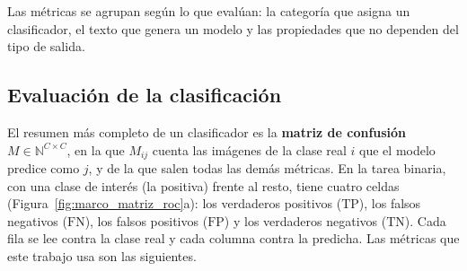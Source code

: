 Las métricas se agrupan según lo que evalúan: la categoría que asigna un clasificador, el texto que genera un
modelo y las propiedades que no dependen del tipo de salida.

\subsection{Evaluación de la clasificación}
\label{sec:marco_eval_clasif}

El resumen más completo de un clasificador es la \textbf{matriz de confusión} $M \in \mathbb{N}^{C \times C}$,
en la que $M_{ij}$ cuenta las imágenes de la clase real $i$ que el modelo predice como $j$, y de la que salen
todas las demás métricas. En la tarea binaria, con una clase de interés (la positiva) frente al resto, tiene
cuatro celdas (Figura~\ref{fig:marco_matriz_roc}a): los verdaderos positivos ($\mathrm{TP}$), los falsos
negativos ($\mathrm{FN}$), los falsos positivos ($\mathrm{FP}$) y los verdaderos negativos ($\mathrm{TN}$). Cada
fila se lee contra la clase real y cada columna contra la predicha. Las métricas que este trabajo usa son las
siguientes.



